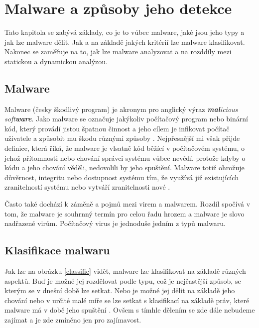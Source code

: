 \chapter{Malware a způsoby jeho detekce} \label{2.chap}

Tato kapitola se zabývá základy, co je to vůbec malware, jaké jsou jeho typy a jak lze malware dělit. Jak a na základě jakých kritérií lze malware klasifikovat.
Nakonec se zaměřuje na to, jak lze malware analyzovat a na rozddíly mezi statickou a dynamickou analýzou. 


\section{Malware}
Malware (česky škodlivý program) je akronym pro anglický výraz \textit{\textbf{mal}icious soft\textbf{ware}}. Jako malware se označuje jakýkoliv počítačový program nebo binární kód, který provádí jistou 
špatnou činnost a jeho cílem je infikovat počítač uživatele a způsobit mu škodu různými způsoby \cite{malware_book}. %
Nejpřesnější mi však přijde definice, která říká, že malware je vlsatně kód běžící v počítačovém systému, o jehož přítomnosti nebo chování správci systému vůbec nevědí, protože kdyby o kódu a jeho chování věděli, nedovolili by jeho spuštění.
Malware totiž ohrožuje důvěrnost, integritu nebo dostupnost systému tím, že využívá již existujících zranitelností systému nebo vytváří zranitelnosti nové \cite{article_malware}.%

Často také dochází k záměně a pojmů mezi virem a malwarem. Rozdíl spočívá v tom, že malware je souhrnný termín pro celou řadu hrozem a malware je slovo nadřazené virům. Počítačový virus je jednoduše jedním z typů malwaru.

\section{Klasifikace malwaru}
Jak lze na obrázku \ref{classific} vidět, malware lze klasifikovat na základě různých aspektů. Buď je možné jej rozdělovat podle typu, což je nejčastější způsob, se kterým se v dnešní době lze setkat. Nebo je možné 
jej dělit na základě jeho chování nebo v určité malé míře se lze setkat s klasifikací na základě práv, které malware má v době jeho spuštění \cite{article_malware}. Ovšem s tímhle dělením se zde dále nebudeme zajímat a je zde zmíněno jen pro zajímavost.

